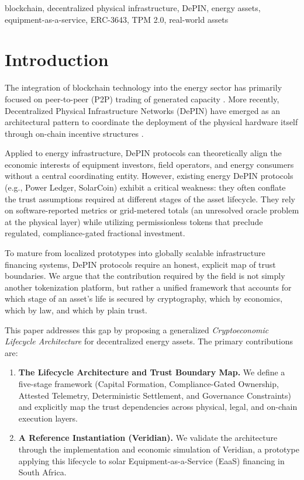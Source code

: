 \documentclass[conference]{IEEEtran}
\begin{document}
\begin{IEEEkeywords}
blockchain, decentralized physical infrastructure, DePIN, energy assets, equipment-as-a-service, ERC-3643, TPM 2.0, real-world assets
\end{IEEEkeywords}

\section{Introduction}

The integration of blockchain technology into the energy sector has primarily focused on peer-to-peer (P2P) trading of generated capacity \cite{pop2018peer,andoni2019blockchain}. More recently, Decentralized Physical Infrastructure Networks (DePIN) have emerged as an architectural pattern to coordinate the deployment of the physical hardware itself through on-chain incentive structures \cite{lin2024depin}. 

Applied to energy infrastructure, DePIN protocols can theoretically align the economic interests of equipment investors, field operators, and energy consumers without a central coordinating entity. However, existing energy DePIN protocols (e.g., Power Ledger, SolarCoin) exhibit a critical weakness: they often conflate the trust assumptions required at different stages of the asset lifecycle. They rely on software-reported metrics or grid-metered totals (an unresolved oracle problem at the physical layer) while utilizing permissionless tokens that preclude regulated, compliance-gated fractional investment.

To mature from localized prototypes into globally scalable infrastructure financing systems, DePIN protocols require an honest, explicit map of trust boundaries. We argue that the contribution required by the field is not simply another tokenization platform, but rather a unified framework that accounts for which stage of an asset's life is secured by cryptography, which by economics, which by law, and which by plain trust.

This paper addresses this gap by proposing a generalized \emph{Cryptoeconomic Lifecycle Architecture} for decentralized energy assets. The primary contributions are:

\begin{enumerate}
  \item \textbf{The Lifecycle Architecture and Trust Boundary Map.} We define a five-stage framework (Capital Formation, Compliance-Gated Ownership, Attested Telemetry, Deterministic Settlement, and Governance Constraints) and explicitly map the trust dependencies across physical, legal, and on-chain execution layers.
  \item \textbf{A Reference Instantiation (Veridian).} We validate the architecture through the implementation and economic simulation of Veridian, a prototype applying this lifecycle to solar Equipment-as-a-Service (EaaS) financing in South Africa.
\end{enumerate}
\end{document}
